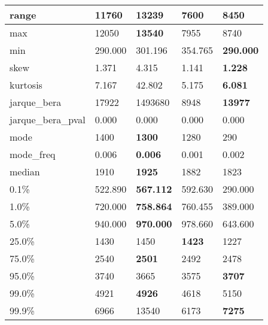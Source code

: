 \begin{table}[H]
\begin{tabular}{|l|m{10em}|m{10em}|m{10em}|m{10em}|}
\hline range & 11760 & \bfseries 13239 & \cellcolor[rgb]{0.9, 0.54, 0.52} 7600 & 8450 \\
\hline max & 12050 & \bfseries 13540 & \cellcolor[rgb]{0.9, 0.54, 0.52} 7955 & 8740 \\
\hline min & 290.000 & 301.196 & \cellcolor[rgb]{0.9, 0.54, 0.52} 354.765 & \bfseries 290.000 \\
\hline skew & 1.371 & \cellcolor[rgb]{0.9, 0.54, 0.52} 4.315 & 1.141 & \bfseries 1.228 \\
\hline kurtosis & 7.167 & \cellcolor[rgb]{0.9, 0.54, 0.52} 42.802 & 5.175 & \bfseries 6.081 \\
\hline jarque\_bera & 17922 & \cellcolor[rgb]{0.9, 0.54, 0.52} 1493680 & 8948 & \bfseries 13977 \\
\hline jarque\_bera\_pval & 0.000 & 0.000 & 0.000 & 0.000 \\
\hline mode & 1400 & \bfseries 1300 & 1280 & \cellcolor[rgb]{0.9, 0.54, 0.52} 290 \\
\hline mode\_freq & 0.006 & \bfseries 0.006 & \cellcolor[rgb]{0.9, 0.54, 0.52} 0.001 & 0.002 \\
\hline median & 1910 & \bfseries 1925 & 1882 & \cellcolor[rgb]{0.9, 0.54, 0.52} 1823 \\
\hline 0.1\% & 522.890 & \bfseries 567.112 & 592.630 & \cellcolor[rgb]{0.9, 0.54, 0.52} 290.000 \\
\hline 1.0\% & 720.000 & \bfseries 758.864 & 760.455 & \cellcolor[rgb]{0.9, 0.54, 0.52} 389.000 \\
\hline 5.0\% & 940.000 & \bfseries 970.000 & 978.660 & \cellcolor[rgb]{0.9, 0.54, 0.52} 643.600 \\
\hline 25.0\% & 1430 & 1450 & \bfseries 1423 & \cellcolor[rgb]{0.9, 0.54, 0.52} 1227 \\
\hline 75.0\% & 2540 & \bfseries 2501 & 2492 & \cellcolor[rgb]{0.9, 0.54, 0.52} 2478 \\
\hline 95.0\% & 3740 & 3665 & \cellcolor[rgb]{0.9, 0.54, 0.52} 3575 & \bfseries 3707 \\
\hline 99.0\% & 4921 & \bfseries 4926 & \cellcolor[rgb]{0.9, 0.54, 0.52} 4618 & 5150 \\
\hline 99.9\% & 6966 & \cellcolor[rgb]{0.9, 0.54, 0.52} 13540 & 6173 & \bfseries 7275 \\
\hline
\end{tabular}
\end{table}
